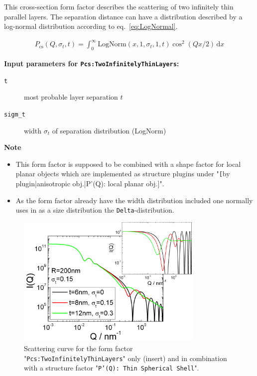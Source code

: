 This cross-section form factor describes the scattering of two infinitely thin parallel layers.
The separation distance can have a distribution described by a log-normal distribution according
to eq.\ \ref{eq:LogNormal}.

\begin{align}
P_\text{cs}(Q,\sigma_{t},t) = \int_0^\infty \textrm{LogNorm}(x,1,\sigma_{t},1,t) \cos^2(Qx/2) \, \textrm{d}x
\end{align}

\noindent
\textbf{Input parameters for \texttt{Pcs:TwoInfinitelyThinLayers}:}
\begin{description}
    \item[\texttt{t}] most probable layer separation $t$
    \item[\texttt{sigm\_t}] width $\sigma_t$ of separation distribution (LogNorm)
\end{description}

\noindent
\textbf{Note}
\begin{itemize}
  \item This form factor is supposed to be combined with a shape factor for
local planar objects which are implemented as structure  plugins
under "\texttt[{by plugin|anisotropic obj.|P'(Q): local planar
obj.]}".
\item As the form factor already have the width distribution included one normally uses in \SASfit as a size distribution
the \texttt{Delta}-distribution.
\end{itemize}

\begin{figure}[htb]
\begin{center}
\includegraphics[width=0.8\textwidth,height=0.55\textwidth]{../images/form_factor/anisotropic/planar2thinIQ.png}
\end{center}
\caption{Scattering curve for the form factor "\texttt{Pcs:TwoInfinitelyThinLayers}" only (insert) and
in combination with a structure factor "\texttt{P'(Q): Thin Spherical Shell}".}
\label{fig_IQ:Pcs:TwoInfinitelyThinLayers}
\end{figure}


